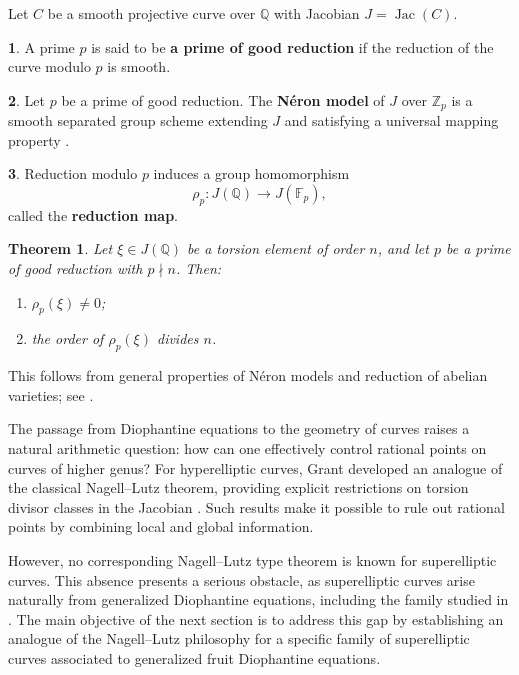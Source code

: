 \documentclass[12pt, reqno]{amsart}
\newtheorem{thm}{Theorem}[section]
\numberwithin{equation}{section}
\theoremstyle{definition}
\theoremstyle{nodefstyle}
\newtheorem*{define}{}
\newcommand{\Jac}{\operatorname{Jac}}
\begin{document}
Let $C$ be a smooth projective curve over $\mathbb{Q}$ with Jacobian $J=\Jac(C)$.
\begin{define}
    A prime $p$ is said to be \textbf{a prime of good reduction} if the reduction of the curve modulo $p$ is smooth.
\end{define}

\begin{define}
Let $p$ be a prime of good reduction. The \textbf{N\'eron model} of $J$ over $\mathbb{Z}_p$
is a smooth separated group scheme extending $J$ and satisfying a universal mapping
property \cite{Neron1964}.
\end{define}

\begin{define}
Reduction modulo $p$ induces a group homomorphism
\[
\rho_p : J(\mathbb{Q}) \longrightarrow J(\mathbb{F}_p),
\]
called the \textbf{reduction map}.
\end{define}

\begin{thm}
Let $\xi \in J(\mathbb{Q})$ be a torsion element of order $n$, and let $p$ be a prime of good
reduction with $p \nmid n$. Then:
\begin{enumerate}
\item $\rho_p(\xi) \neq 0$;
\item the order of $\rho_p(\xi)$ divides $n$.
\end{enumerate}
\end{thm}

This follows from general properties of N\'eron models and reduction of abelian varieties;
see \cite[Theorem~IV.6.1]{Silverman1994}.

The passage from Diophantine equations to the geometry of curves raises a natural
arithmetic question: how can one effectively control rational points on curves of higher genus? For hyperelliptic curves, Grant developed an analogue of the classical Nagell--Lutz
theorem, providing explicit restrictions on torsion divisor classes in the Jacobian
\cite{Grant2013}. Such results make it possible to rule out rational points by combining
local and global information.

However, no corresponding Nagell--Lutz type theorem is known for superelliptic curves.
This absence presents a serious obstacle, as superelliptic curves arise naturally from
generalized Diophantine equations, including the family studied in . The main
objective of the next section is to address this gap by establishing an analogue of the
Nagell--Lutz philosophy for a specific family of superelliptic curves associated to
generalized fruit Diophantine equations.
\end{document}
